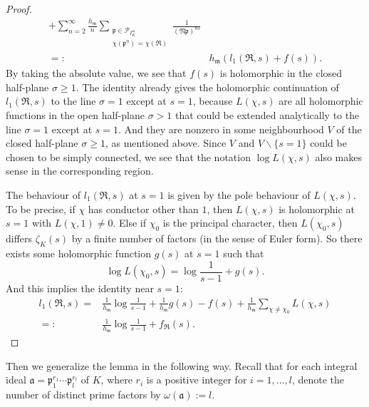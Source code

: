 \documentclass{amsart}
\numberwithin{equation}{section}
\theoremstyle{plain}
\theoremstyle{definition}
\theoremstyle{remark}
\begin{document}
\begin{proof}
\begin{equation*}
\begin{aligned}
			+\sum_{n=2}^\infty\frac{h_{\mathfrak{m}}}{n}
			\sum_{
				\substack{
					\mathfrak{p}\in\mathcal{P}_{I_K^{\mathfrak{m}}}\\
					\chi(\mathfrak{p}^n)=\chi(\mathfrak{R})
				}
			}\frac{1}{(\mathfrak{N}\mathfrak{p})^{ns}}
			\\
			=:&h_{\mathfrak{m}}(l_1(\mathfrak{R},s)+f(s)).
		\end{aligned}
	\end{equation*}
	By taking the absolute value, we see that $f(s)$ is holomorphic in the closed half-plane $\sigma\geq1$.
	The identity already gives the holomorphic continuation of $l_1(\mathfrak{R},s)$ to the line $\sigma=1$ except at $s=1$, because $L(\chi,s)$ are all holomorphic functions in the open half-plane $\sigma>1$ that could be extended analytically to the line $\sigma=1$ except at $s=1$.
	And they are nonzero in some neighbourhood $V$ of the closed half-plane $\sigma\geq1$, as mentioned above.
        Since $V$ and $V\backslash\{s=1\}$ could be chosen to be simply connected, we see that the notation $\log L(\chi,s)$ also makes sense in the corresponding region.
	
	The behaviour of $l_1(\mathfrak{R},s)$ at $s=1$ is given by the pole behaviour of $L(\chi,s)$.
	To be precise, if $\chi$ has conductor other than $1$, then $L(\chi,s)$ is holomorphic at $s=1$ with $L(\chi,1)\neq0$.
	Else if $\chi_0$ is the principal character, then $L(\chi_0,s)$ differs $\zeta_K(s)$ by a finite number of factors (in the sense of Euler form).
	So there exists some holomorphic function $g(s)$ at $s=1$ such that
	\begin{equation*}
		\log L(\chi_0,s)=\log\frac{1}{s-1}+g(s).
	\end{equation*}
	And this implies the identity near $s=1$:
	\begin{equation*}
		\begin{aligned}
			l_1(\mathfrak{R},s)
			=&\frac{1}{h_{\mathfrak{m}}}\log\frac{1}{s-1}+\frac{1}{h_{\mathfrak{m}}}g(s)-f(s)+\frac{1}{h_{\mathfrak{m}}}\sum_{\chi\neq\chi_0}L(\chi,s)
			\\
			=:&\frac{1}{h_{\mathfrak{m}}}\log\frac{1}{s-1}+f_{\mathfrak{R}}(s).
		\end{aligned}
	\end{equation*}
\end{proof}
Then we generalize the lemma in the following way.
Recall that for each integral ideal $\mathfrak{a}=\mathfrak{p}_1^{r_1}\cdots\mathfrak{p}_l^{r_l}$ of $K$, where $r_i$ is a positive integer for $i=1,\dots,l$, denote the number of distinct prime factors by $\omega(\mathfrak{a}):=l$.
\end{document}
